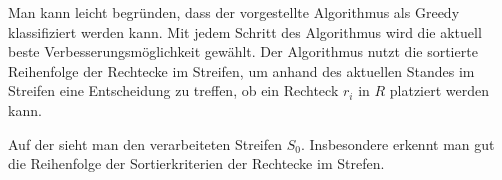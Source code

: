 Man kann leicht begründen, dass der vorgestellte Algorithmus als Greedy klassifiziert werden
kann.
Mit jedem Schritt des Algorithmus wird die aktuell beste Verbesserungsmöglichkeit gewählt.
Der Algorithmus nutzt die sortierte Reihenfolge der Rechtecke im Streifen, um anhand
des aktuellen Standes im Streifen eine Entscheidung zu treffen, ob ein Rechteck $r_i$ in $R$
platziert werden kann.

Auf der  sieht man den verarbeiteten Streifen $S_0$.
Insbesondere erkennt man gut die Reihenfolge der Sortierkriterien der Rechtecke
im Strefen.


